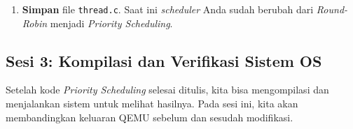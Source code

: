 \begin{enumerate}
\begin{itemize}
		      \item \textbf{Tahap 2 (Pengambilan):} Simpan pointer thread terpilih dari \texttt{ready\_queue[best\_idx]} ke variabel \texttt{next}.

		      \item \textbf{Tahap 3 (Penggeseran):} Karena thread yang diambil mungkin bukan dari posisi depan antrean (berbeda dengan FIFO), elemen-elemen setelahnya harus digeser maju satu posisi untuk menutup celah. Ini dilakukan oleh loop \texttt{while} yang bergerak dari \texttt{best\_idx} hingga \texttt{ready\_tail}. Terakhir, mundurkan \texttt{ready\_tail} dan kurangi \texttt{ready\_count}.
	      \end{itemize}

	      \textit{Catatan penting: Jika muncul error \texttt{implicit declaration of function} saat kompilasi, pastikan Anda tidak menghapus baris \texttt{\#include "thread.h"} dan \texttt{\#include "types.h"} di awal file.}

	      \textit{Jika muncul warning \texttt{comparison of unsigned expression < 0 is always true}, pastikan tipe data \texttt{ready\_count} adalah \texttt{uint32\_t} (bukan \texttt{int}). Cek deklarasi variabel di bagian atas file \texttt{thread.c}.}

	\item \textbf{Simpan} file \texttt{thread.c}. Saat ini \textit{scheduler} Anda sudah berubah dari \textit{Round-Robin} menjadi \textit{Priority Scheduling}.
\end{enumerate}

\subsection{Sesi 3: Kompilasi dan Verifikasi Sistem OS}
\label{sec:m12-sesi-3}

Setelah kode \textit{Priority Scheduling} selesai ditulis, kita bisa mengompilasi dan menjalankan sistem untuk melihat hasilnya. Pada sesi ini, kita akan membandingkan keluaran QEMU sebelum dan sesudah modifikasi.

